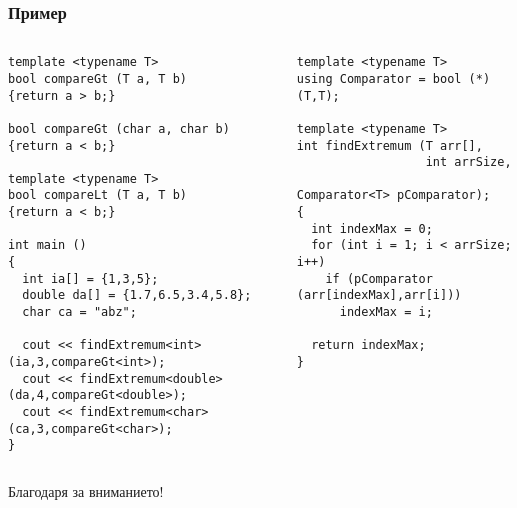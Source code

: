 \documentclass{beamer}
\begin{document}
\begin{frame}[fragile]
\frametitle{Пример}



\begin{columns}[t]
  \begin{column}{0.55\textwidth}
\begin{flushleft}
\begin{lstlisting}
template <typename T>
bool compareGt (T a, T b) 
{return a > b;}

bool compareGt (char a, char b) 
{return a < b;}

template <typename T>
bool compareLt (T a, T b) 
{return a < b;}

int main ()
{
  int ia[] = {1,3,5};
  double da[] = {1.7,6.5,3.4,5.8};
  char ca = "abz";

  cout << findExtremum<int> (ia,3,compareGt<int>);
  cout << findExtremum<double> (da,4,compareGt<double>);
  cout << findExtremum<char> (ca,3,compareGt<char>);
}

\end{lstlisting}  
\end{flushleft}
  \end{column}
  \begin{column}{0.45\textwidth}
\begin{flushleft}
\begin{lstlisting}
template <typename T>
using Comparator = bool (*)(T,T);

template <typename T>
int findExtremum (T arr[], 
                  int arrSize, 
                  Comparator<T> pComparator);
{
  int indexMax = 0;
  for (int i = 1; i < arrSize; i++)
    if (pComparator (arr[indexMax],arr[i]))
      indexMax = i;

  return indexMax;
}
\end{lstlisting}  
\end{flushleft}
  \end{column}
\end{columns}
  
\end{frame}


\begin{frame}
\centerline{Благодаря за вниманието!}
\end{frame}
\end{document}
